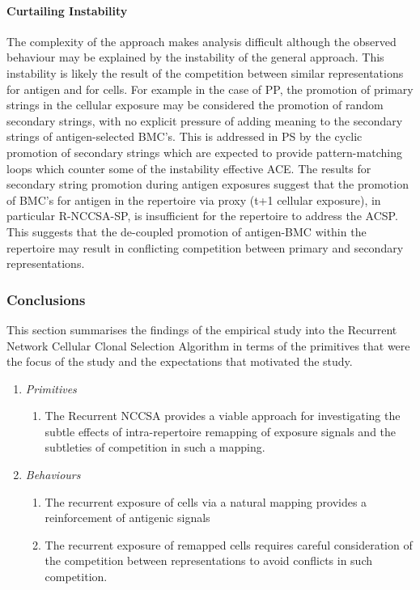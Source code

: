 %
%
\paragraph{Curtailing Instability}
The complexity of the approach makes analysis difficult although the observed behaviour may be explained by the instability of the general approach. This instability is likely the result of the competition between similar representations for antigen and for cells. For example in the case of PP, the promotion of primary strings in the cellular exposure may be considered the promotion of random secondary strings, with no explicit pressure of adding meaning to the secondary strings of antigen-selected BMC's. This is addressed in PS by the cyclic promotion of secondary strings which are expected to provide pattern-matching loops which counter some of the instability effective ACE.
The results for secondary string promotion during antigen exposures suggest that the promotion of BMC's for antigen in the repertoire via proxy (t+1 cellular exposure), in particular R-NCCSA-SP, is insufficient for the repertoire to address the ACSP. This suggests that the de-coupled promotion of antigen-BMC within the repertoire may result in conflicting competition between primary and secondary representations.

%
%
\subsubsection{Conclusions}
This section summarises the findings of the empirical study into the Recurrent Network Cellular Clonal Selection Algorithm in terms of the primitives that were the focus of the study and the expectations that motivated the study.

\begin{enumerate}
	\item \emph{Primitives}
		\begin{enumerate}
			\item The Recurrent NCCSA provides a viable approach for investigating the subtle effects of intra-repertoire remapping of exposure signals and the subtleties of competition in such a mapping.
		\end{enumerate}
		
	\item \emph{Behaviours}
	\begin{enumerate}
		\item The recurrent exposure of cells via a natural mapping provides a reinforcement of antigenic signals
		\item The recurrent exposure of remapped cells requires careful consideration of the competition between representations to avoid conflicts in such competition.
	\end{enumerate}	
\end{enumerate}


